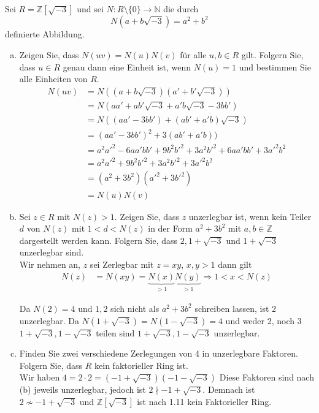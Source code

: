 \documentclass{article}
\newcommand{\N}{\mathbb{N}}
\newcommand{\Z}{\mathbb{Z}}
\begin{document}
\subsection{}
Sei $R=\Z[\sqrt{-3}]$ und sei $N:R\setminus\{0\}\rightarrow
\N$ die durch
\begin{equation*}
    N(a+b\sqrt{-3})=a^2+b^2
\end{equation*}
definierte Abbildung.
\color{black}
\begin{enumerate}[(a)]
    \item
        \color{blue}
        Zeigen Sie, dass $N(uv)=N(u)N(v)$ für alle $u,b\in R$
        gilt. Folgern Sie, dass $u\in R$ genau dann eine
        Einheit ist, wenn $N(u)=1$ und bestimmen Sie alle
        Einheiten von $R$.\\
        \color{black}
        \begin{align*}
            N(uv)&=N((a+b\sqrt{-3})(a'+b'\sqrt{-3}))\\
            &=N(aa'+ab'\sqrt{-3}+a'b\sqrt{-3}-3bb')\\
            &=N((aa'-3bb')+(ab'+a'b)\sqrt{-3})\\
            &=(aa'-3bb')^2+3(ab'+a'b))\\
            &=a^2a'^2-6aa'bb'+9b^2b'^2+3a^2b'^2
            +6aa'bb'+3a'^2b^2\\
            &=a^2a'^2+9b^2b'^2+3a^2b'^2+3a'^2b^2\\
            &=(a^2+3b^2)(a'^2+3b'^2)\\
            &=N(u)N(v)
        \end{align*}
    \item
        \color{blue}
        Sei $z\in R$ mit $N(z)>1$. Zeigen Sie, dass $z$
        unzerlegbar ist, wenn kein Teiler $d$ von $N(z)$
        mit $1<d<N(z)$ in der Form $a^2+3b^2$ mit $a,b\in\Z$
        dargestellt werden kann. Folgern Sie, dass $2,
        1+\sqrt{-3}$ und $1+\sqrt{-3}$ unzerlegbar sind.\\
        \color{black}
        Wir nehmen an, $z$ sei Zerlegbar mit $z=xy$,
        $x,y>1$
        dann gilt
        \begin{align*}
            N(z)&=N(xy)=
            \underbrace{N(x)}_{>1}
            \underbrace{N(y)}_{>1}
            \Rightarrow 1<x<N(z)
        \end{align*}

        Da $N(2)=4$ und $1,2$ sich nicht als
        $a^2+3b^2$ schreiben lassen, ist 2 unzerlegbar.
        Da $N(1+\sqrt{-3})=N(1-\sqrt{-3})=4$ und weder
        2, noch 3 $1+\sqrt{-3},1-\sqrt{-3}$ teilen sind
        $1+\sqrt{-3},1-\sqrt{-3}$ unzerlegbar.
    \item
        \color{blue}
        Finden Sie zwei verschiedene Zerlegungen von 4 in
        unzerlegbare Faktoren. Folgern Sie, dass $R$ kein
        faktorieller Ring ist.\\
        \color{black}
        Wir haben $4=2\cdot 2=(-1+\sqrt{-3})(-1-\sqrt{-3})$
        Diese Faktoren sind nach (b) jeweils unzerlegbar,
        jedoch ist $2\nmid -1+\sqrt{-3}$. Demnach ist
        $2\nsim -1+\sqrt{-3}$ und  $\Z[\sqrt{-3}]$
        ist nach 1.11 kein Faktorieller Ring.
\end{enumerate}
\end{document}
